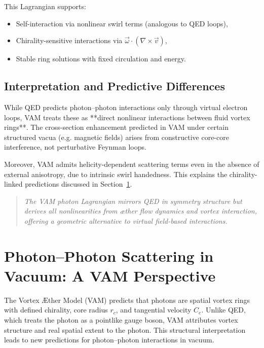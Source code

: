     This Lagrangian supports:
    \begin{itemize}
        \item Self-interaction via nonlinear swirl terms (analogous to QED loops),
        \item Chirality-sensitive interactions via \( \vec{\omega} \cdot (\nabla \times \vec{v}) \),
        \item Stable ring solutions with fixed circulation and energy.
    \end{itemize}

    \subsection{Interpretation and Predictive Differences}

    While QED predicts photon–photon interactions only through virtual electron loops, VAM treats these as **direct nonlinear interactions between fluid vortex rings**. The cross-section enhancement predicted in VAM under certain structured vacua (e.g. magnetic fields) arises from constructive core-core interference, not perturbative Feynman loops.

    Moreover, VAM admits helicity-dependent scattering terms even in the absence of external anisotropy, due to intrinsic swirl handedness. This explains the chirality-linked predictions discussed in Section~\ref{sec:photon-scattering}.

    \begin{quote}
        \emph{The VAM photon Lagrangian mirrors QED in symmetry structure but derives all nonlinearities from æther flow dynamics and vortex interaction, offering a geometric alternative to virtual field-based interactions.}
    \end{quote}


\section{Photon–Photon Scattering in Vacuum: A VAM Perspective}\label{sec:photon-scattering}

        The Vortex \AE ther Model (VAM) predicts that photons are spatial vortex rings with defined chirality, core radius \( r_c \), and tangential velocity \( C_e \). Unlike QED, which treats the photon as a pointlike gauge boson, VAM attributes vortex structure and real spatial extent to the photon. This structural interpretation leads to new predictions for photon–photon interactions in vacuum.

